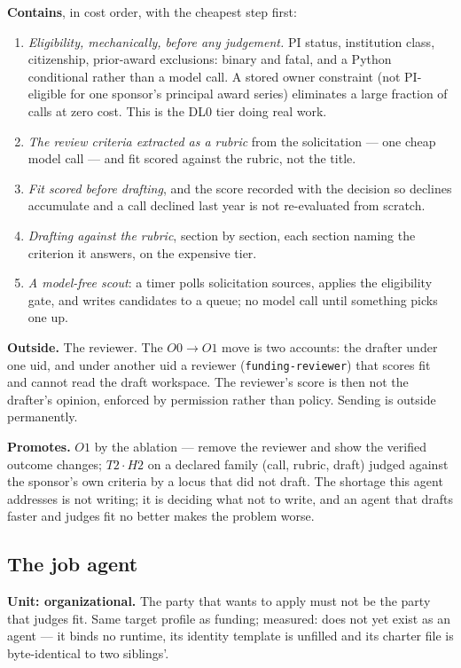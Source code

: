 \documentclass[11pt]{article}
\theoremstyle{definition}
\begin{document}
\textbf{Contains}, in cost order, with the cheapest step first:
\begin{enumerate}[leftmargin=*]
\item \emph{Eligibility, mechanically, before any judgement.} PI status, institution class, citizenship, prior-award exclusions: binary and fatal, and a Python conditional rather than a model call. A stored owner constraint (not PI-eligible for one sponsor's principal award series) eliminates a large fraction of calls at zero cost. This is the DL0 tier doing real work.
\item \emph{The review criteria extracted as a rubric} from the solicitation --- one cheap model call --- and fit scored against the rubric, not the title.
\item \emph{Fit scored before drafting}, and the score recorded with the decision so declines accumulate and a call declined last year is not re-evaluated from scratch.
\item \emph{Drafting against the rubric}, section by section, each section naming the criterion it answers, on the expensive tier.
\item \emph{A model-free scout}: a timer polls solicitation sources, applies the eligibility gate, and writes candidates to a queue; no model call until something picks one up.
\end{enumerate}

\textbf{Outside.} The reviewer. The $O0\to O1$ move is two accounts: the drafter under one uid, and under another uid a reviewer (\texttt{funding-reviewer}) that scores fit and cannot read the draft workspace. The reviewer's score is then not the drafter's opinion, enforced by permission rather than policy. Sending is outside permanently.

\textbf{Promotes.} $O1$ by the ablation --- remove the reviewer and show the verified outcome changes; $T2\cdot H2$ on a declared family (call, rubric, draft) judged against the sponsor's own criteria by a locus that did not draft. The shortage this agent addresses is not writing; it is deciding what not to write, and an agent that drafts faster and judges fit no better makes the problem worse.

\subsection{The job agent}\label{sec:job}

\textbf{Unit: organizational.} The party that wants to apply must not be the party that judges fit. Same target profile as funding; measured: does not yet exist as an agent --- it binds no runtime, its identity template is unfilled and its charter file is byte-identical to two siblings'.
\end{document}
